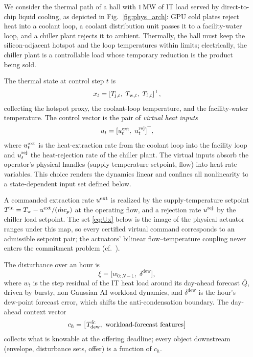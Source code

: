 We consider the thermal path of a hall with $1$\,MW of IT load served by
direct-to-chip liquid cooling, as depicted in Fig.~\ref{fig:phys_arch}: GPU
cold plates reject heat into a coolant loop, a coolant distribution unit
passes it to a facility-water loop, and a chiller plant rejects it to ambient.
Thermally, the hall must keep the silicon-adjacent hotspot and the loop
temperatures within limits; electrically, the chiller plant is a
controllable load whose temporary reduction is the product being sold.

The thermal state at control step $t$ is
\begin{equation}
x_t = [\Tj[t],\; \Tw[t],\; \Tf[t]]^\top,
\end{equation}
collecting the hotspot proxy, the coolant-loop temperature, and the
facility-water temperature. The control vector is the pair of \emph{virtual
heat inputs}
\begin{equation}
u_t = [u^{\mathrm{ext}}_t,\; u^{\mathrm{rej}}_t]^\top,
\end{equation}
where $u^{\mathrm{ext}}_t$ is the heat-extraction rate from the coolant loop into the
facility loop and $u^{\mathrm{rej}}_t$ the heat-rejection rate of the chiller plant. The
virtual inputs absorb the operator's physical handles (supply-temperature
setpoint, flow) into heat-rate variables. This choice renders the dynamics
linear and confines all nonlinearity to a state-dependent input set defined
below.

\begin{remark}\label{rem:realization}
A commanded extraction rate $u^{\mathrm{ext}}$ is realized by the supply-temperature
setpoint $T^{\mathrm{in}} = \Tw - \uext/(\mdot c_p)$ at the operating flow,
and a rejection rate $u^{\mathrm{rej}}$ by the chiller load setpoint. The set
\eqref{eq:Ux} below is the image of the physical actuator ranges under this
map,
so every certified virtual command corresponds to an admissible setpoint
pair; the actuators' bilinear flow--temperature coupling never enters the
commitment problem (cf.~\cite{shen2026cdro}).
\end{remark}

The disturbance over an hour is
\begin{equation}
\xi = \bigl[w_{0:N-1},\; \delta^{\mathrm{dew}}\bigr] ,
\end{equation}
where $w_t$ is the step residual of the IT heat load around its day-ahead
forecast $\bar Q$, driven by bursty, non-Gaussian AI workload dynamics, and
$\delta^{\mathrm{dew}}$ is the hour's dew-point forecast error, which shifts
the anti-condensation boundary. The day-ahead context vector
\begin{equation}
c_h = \bigl[\Tdew^{\mathrm{fc}},\ \text{workload-forecast features}\bigr]
\label{eq:context}
\end{equation}
collects what is knowable at the offering deadline; every object downstream
(envelope, disturbance sets, offer) is a function of $c_h$.

